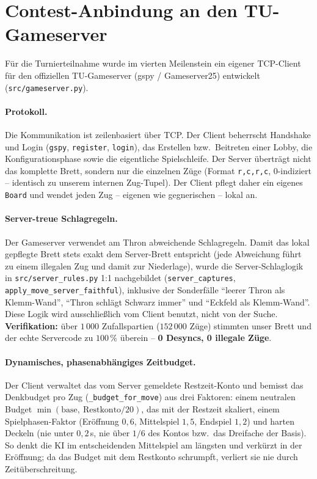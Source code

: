 \documentclass[11pt,a4paper]{article}
\newcommand{\code}[1]{\texttt{\small #1}}
\begin{document}
\section{Contest-Anbindung an den TU-Gameserver}\label{sec:contest}
F\"ur die Turnierteilnahme wurde im vierten Meilenstein ein eigener TCP-Client
f\"ur den offiziellen TU-Gameserver (gspy / Gameserver25) entwickelt
(\code{src/gameserver.py}).

\paragraph{Protokoll.}
Die Kommunikation ist zeilenbasiert \"uber TCP.
Der Client beherrscht Handshake und Login (\code{gspy}, \code{register},
\code{login}), das Erstellen bzw.\ Beitreten einer Lobby, die Konfigurationsphase
sowie die eigentliche Spielschleife.
Der Server \"ubertr\"agt nicht das komplette Brett, sondern nur die einzelnen
Z\"uge (Format \code{r,c,r,c}, 0-indiziert -- identisch zu unserem internen
Zug-Tupel).
Der Client pflegt daher ein eigenes \code{Board} und wendet jeden Zug -- eigenen
wie gegnerischen -- lokal an.

\paragraph{Server-treue Schlagregeln.}
Der Gameserver verwendet am Thron abweichende Schlagregeln.
Damit das lokal gepflegte Brett stets exakt dem Server-Brett entspricht (jede
Abweichung f\"uhrt zu einem illegalen Zug und damit zur Niederlage), wurde die
Server-Schlaglogik in \code{src/server\_rules.py} 1:1 nachgebildet
(\code{server\_captures}, \code{apply\_move\_server\_faithful}), inklusive der
Sonderf\"alle ``leerer Thron als Klemm-Wand'', ``Thron schl\"agt Schwarz immer''
und ``Eckfeld als Klemm-Wand''.
Diese Logik wird ausschlie\ss lich vom Client benutzt, nicht von der Suche.
\textbf{Verifikation:} \"uber $1\,000$ Zufallspartien
($152\,000$ Z\"uge) stimmten unser Brett und der echte Servercode zu
$100\,\%$ \"uberein -- \textbf{0 Desyncs, 0 illegale Z\"uge}.

\paragraph{Dynamisches, phasenabh\"angiges Zeitbudget.}
Der Client verwaltet das vom Server gemeldete Restzeit-Konto und bemisst das
Denkbudget pro Zug (\code{\_budget\_for\_move}) aus drei Faktoren: einem neutralen
Budget $\min(\text{base},\ \text{Restkonto}/20)$, das mit der Restzeit skaliert,
einem Spielphasen-Faktor (Er\"offnung $0{,}6$, Mittelspiel $1{,}5$, Endspiel $1{,}2$)
und harten Deckeln (nie unter $0{,}2$\,s, nie \"uber $1/6$ des Kontos bzw.\ das
Dreifache der Basis).
So denkt die KI im entscheidenden Mittelspiel am l\"angsten und verk\"urzt in der
Er\"offnung; da das Budget mit dem Restkonto schrumpft, verliert sie nie durch
Zeit\"uberschreitung.
\end{document}
